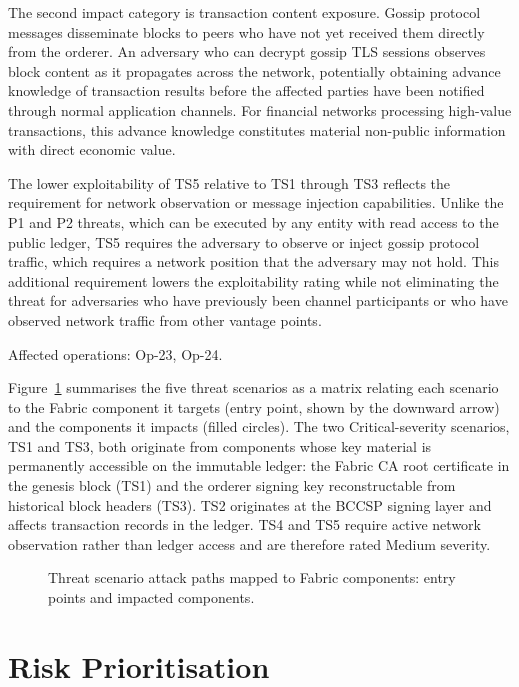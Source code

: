 \documentclass[conference]{IEEEtran}
\begin{document}
The second impact category is transaction content exposure. Gossip
protocol messages disseminate blocks to peers who have not yet received
them directly from the orderer. An adversary who can decrypt gossip TLS
sessions observes block content as it propagates across the network,
potentially obtaining advance knowledge of transaction results before
the affected parties have been notified through normal application
channels. For financial networks processing high-value transactions,
this advance knowledge constitutes material non-public information with
direct economic value.

The lower exploitability of TS5 relative to TS1 through TS3 reflects
the requirement for network observation or message injection capabilities.
Unlike the P1 and P2 threats, which can be executed by any entity with
read access to the public ledger, TS5 requires the adversary to observe
or inject gossip protocol traffic, which requires a network position
that the adversary may not hold. This additional requirement lowers the
exploitability rating while not eliminating the threat for adversaries
who have previously been channel participants or who have observed
network traffic from other vantage points.

Affected operations: Op-23, Op-24.

Figure~\ref{fig:threat_attack_paths} summarises the five threat scenarios
as a matrix relating each scenario to the Fabric component it targets
(entry point, shown by the downward arrow) and the components it impacts
(filled circles). The two Critical-severity scenarios, TS1 and TS3, both
originate from components whose key material is permanently accessible on
the immutable ledger: the Fabric CA root certificate in the genesis block
(TS1) and the orderer signing key reconstructable from historical block
headers (TS3). TS2 originates at the BCCSP signing layer and affects
transaction records in the ledger. TS4 and TS5 require active network
observation rather than ledger access and are therefore rated Medium
severity.

\begin{figure}[ht]
\centering

\caption[Threat scenario attack paths mapped to Fabric components.]
{Threat scenario attack paths mapped to Fabric components: entry points and impacted components.}
\label{fig:threat_attack_paths}
\end{figure}

\section{Risk Prioritisation}
\label{sec:tm_risk}
\end{document}
